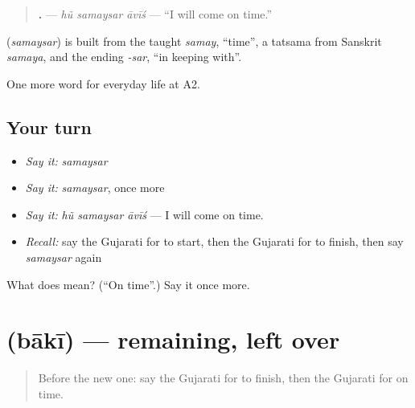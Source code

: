 \begin{quote}
\textbf{  .} — \emph{hũ samaysar āvīś} — \textquotedblleft{}I will come on time.\textquotedblright{}
\end{quote}

\begin{cousinweb}
\textbf{} (\emph{samaysar}) is built from the taught \emph{samay}, \textquotedblleft{}time\textquotedblright{}, a tatsama from Sanskrit \emph{samaya}, and the ending \emph{-sar}, \textquotedblleft{}in keeping with\textquotedblright{}.
\end{cousinweb}

\begin{grammarlens}[title={What you've built}]
One more word for everyday life at A2.
\end{grammarlens}

\subsection*{Your turn}
\begin{itemize}
\raggedright
  \item \emph{Say it:} \emph{samaysar}
  \item \emph{Say it:} \emph{samaysar}, once more
  \item \emph{Say it:} \emph{hũ samaysar āvīś} — I will come on time.
  \item \emph{Recall:} say the Gujarati for to start, then the Gujarati for to finish, then say \emph{samaysar} again
\end{itemize}

\begin{tcolorbox}[breakable,colback=teal!4,colframe=teal!35!black,title={Before you move on}]
What does  mean? (\textquotedblleft{}On time\textquotedblright{}.) Say it once more.
\end{tcolorbox}
\section[\texorpdfstring{\gu{બાકી} (bākī)}{બાકી (bākī)}]{ (bākī) — remaining, left over}

\label{lesson:GU-C178-baki}



\begin{quote}
Before the new one: say the Gujarati for to finish, then the Gujarati for on time.
\end{quote}

